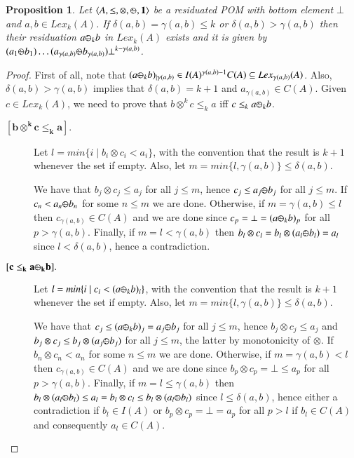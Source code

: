 \documentclass[a4paper]{elsarticle}
\newtheorem{proposition}{Proposition}
\newcommand{\monop}{\otimes}
\newcommand{\1}{\mathbf{1}}
\def\odiv{{ \ominus\hspace{-8pt}:}\;}
\begin{document}
\begin{proposition}
	\label{div2}
	Let $\langle A, \leq, \monop, \odiv, \1 \rangle$
	be a residuated POM with bottom element $\bot$ and $a, b \in Lex_k(A)$.
	If $\delta(a,b) = \gamma(a,b) \leq k$ or $\delta(a,b) >  \gamma(a,b)$
	then their residuation $a \odiv_k b$ 
	in $Lex_k(A)$ exists and it is given by
	$(a_1 \odiv b_1) \ldots  (a_{\gamma(a, b)}  \odiv b_{\gamma(a, b)}) 
	\bot^{k - \gamma(a, b)}$.
\end{proposition}

\begin{proof}
	First of all, note that 
	$(a \odiv_k b)_{\mid \gamma(a,b)} \in I(A)^{\gamma(a,b)-1} C(A) \subseteq Lex_{\gamma(a,b)}(A)$.
	Also, $\delta(a,b) >  \gamma(a,b)$ implies that 
	$\delta(a,b) = k+1$ and $a_{\gamma(a,b)} \in C(A)$.
	Given $c \in Lex_k(A)$, we need to prove that
	$b\otimes^k c \leq_k a$ iff $c \leq_k a \odiv_k b$.
	
	\begin{description}
		\item[$\mathbf{[b\otimes^k c \leq_k a].}$]
		Let $l = min \{ i \mid b_i \otimes c_i < a_i\}$,
		with the convention that the result is $k+1$ whenever the set if empty.
		Also, let $m = min \{l, \gamma(a,b)\} \leq \delta(a,b)$.
		
		We have that $b_j \otimes c_j \leq a_j$ for all $j \leq m$, hence
		$c_j \leq a_j \odiv b_j $ for all $j \leq m$. 
		If $c_n < a_n \odiv b_n$ for some $n \leq m$
		we are done. 
		Otherwise, if $m = \gamma(a,b) \leq l$ then 
		$c_{\gamma(a,b)} \in C(A)$ and we are done since
		$c_p = \bot = (a \odiv_k b)_p$ for all $p > {\gamma(a,b)}$.
		Finally, if $m = l < \gamma(a,b)$ then 
		$b_l \otimes c_l = b_l \otimes (a_l \odiv b_l) = a_l$
		since $l < \delta(a,b)$, hence a contradiction.
		
		\item[$\mathbf{[c \leq_k a \odiv_k b].}$]
		Let $l = min \{ i \mid c_i < (a \odiv_k b)_i\}$,
		with the convention that the result is $k+1$ whenever the set if empty.
		Also, let $m = min \{l, \gamma(a,b)\} \leq \delta(a,b)$.
		
		We have that $c_j \leq (a \odiv_k b)_j = a_j \odiv b_j$ for all $j \leq m$, hence
		$b_j \otimes c_j \leq a_j$ and $b_j \otimes c_j \leq b_j \otimes (a_j \odiv b_j)$ 
		for all $j \leq m$, the latter by monotonicity of $\otimes$.
		If $b_n \otimes c_n < a_n$ for some $n \leq m$
		we are done. 
		Otherwise, if $m = \gamma(a,b) < l$ then 
		$c_{\gamma(a,b)} \in C(A)$ and we are done since
		$b_p \otimes c_p = \bot \leq a_p$ for all $p > {\gamma(a,b)}$.
		Finally, if $m = l \leq \gamma(a,b)$ then 
		$b_l \otimes (a_l \odiv b_l) \leq a_l  = b_l \otimes c_l \leq b_l \otimes (a_l \odiv b_l)$
		since $l \leq \delta(a,b)$, hence either a contradiction
		if $b_l \in I(A)$ or $b_p \otimes c_p = \bot = a_p$ for all $p > l$
		if $b_l \in C(A)$ and consequently $a_l \in C(A)$.
	\end{description}
\end{proof}
\end{document}
